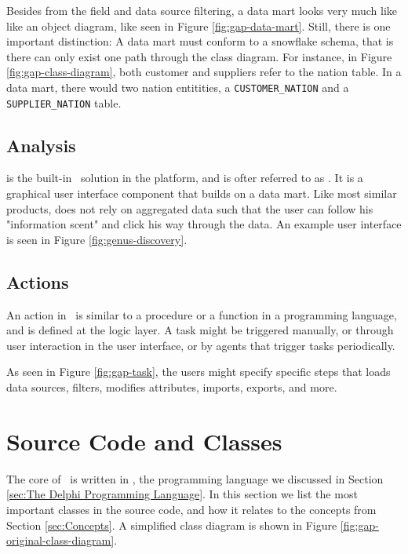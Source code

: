 Besides from the field and data source filtering, a data mart looks very much like like an object diagram, like seen in Figure \ref{fig:gap-data-mart}. Still, there is one important distinction: A data mart must conform to a snowflake schema, that is there can only exist one path through the class diagram. For instance, in Figure \ref{fig:gap-class-diagram}, both customer and suppliers refer to the nation table. In a data mart, there would two nation entitities, a \texttt{CUSTOMER\_NATION} and a \texttt{SUPPLIER\_NATION} table.

\subsection{Analysis}
\label{sub:Analysis}
 is the built-in \bd~solution in the platform, and is ofter referred to as . It is a graphical user interface component that builds on a data mart. Like most similar products,  does not rely on aggregated data such that the user can follow his "information scent" and click his way through the data. An example user interface is seen in Figure \ref{fig:genus-discovery}.

\subsection{Actions}
\label{sub:Actions}
An action in \gap~is similar to a procedure or a function in a programming language, and is defined at the logic layer. A task might be triggered manually, or through user interaction in the user interface, or by agents that trigger tasks periodically.

As seen in Figure \ref{fig:gap-task}, the users might specify specific steps that loads data sources, filters, modifies attributes, imports, exports, and more.


\section{Source Code and Classes}
\label{sec:Source Code and Classes}
The core of \gap~is written in \delphi, the programming language we discussed in Section \ref{sec:The Delphi Programming Language}. In this section we list the most important classes in the source code, and how it relates to the concepts from Section \ref{sec:Concepts}. A simplified class diagram is shown in Figure \ref{fig:gap-original-class-diagram}.

